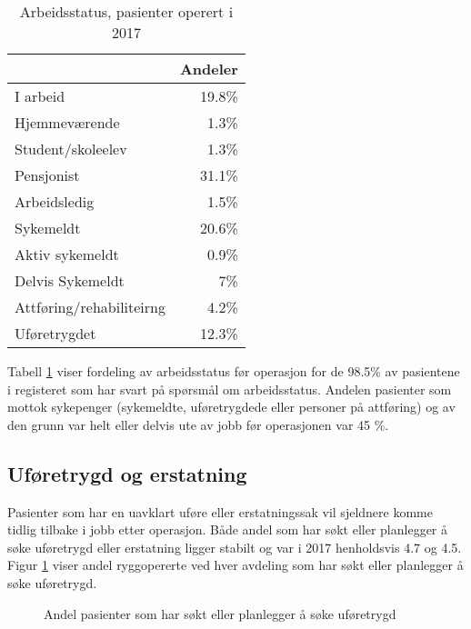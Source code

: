 \documentclass [norsk,a4paper,twoside]{article}\usepackage[]{graphicx}\usepackage[]{color}
\begin{document}
\begin{table}[ht]
\centering
\begin{tabular}{lr}
  \hline
 & Andeler \\ 
  \hline
I arbeid & 19.8\% \\ 
  Hjemmeværende & 1.3\% \\ 
  Student/skoleelev & 1.3\% \\ 
  Pensjonist & 31.1\% \\ 
  Arbeidsledig & 1.5\% \\ 
  Sykemeldt & 20.6\% \\ 
  Aktiv sykemeldt & 0.9\% \\ 
  Delvis Sykemeldt & 7\% \\ 
  Attføring/rehabiliteirng & 4.2\% \\ 
  Uføretrygdet & 12.3\% \\ 
   \hline
\end{tabular}
\caption{Arbeidsstatus, pasienter operert i 2017} 
\label{tab:Arb}
\end{table}


Tabell \ref{tab:Arb} viser fordeling av arbeidsstatus før operasjon for de 98.5\% 
av pasientene i registeret som har svart på spørsmål om arbeidsstatus. 
Andelen pasienter som mottok sykepenger (sykemeldte, uføretrygdede eller personer 
på attføring) og av den grunn var helt eller delvis ute av jobb før operasjonen var 
45 \%. 



\subsection{Uføretrygd og erstatning }




Pasienter som har en uavklart uføre eller erstatningssak vil sjeldnere komme tidlig tilbake i jobb etter operasjon.
Både andel som har søkt eller planlegger å søke uføretrygd eller erstatning ligger stabilt og var i 2017 
henholdsvis 4.7 og 4.5. 
Figur \ref{fig:Ufor} viser andel ryggopererte ved hver avdeling som har søkt eller planlegger å søke uføretrygd.

\begin{figure}[ht]
\caption{\label{fig:Ufor} Andel pasienter som har søkt eller planlegger å søke uføretrygd} 
\end{figure}
\end{document}
